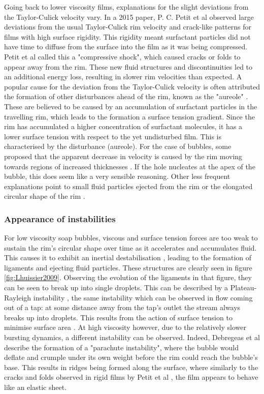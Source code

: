 \documentclass[a4paper,12pt]{article}
\numberwithin{equation}{section}
\numberwithin{figure}{section}
\numberwithin{table}{section}
\begin{document}
Going back to lower viscosity films, explanations for the slight deviations from the Taylor-Culick velocity vary. In a 2015 paper, P. C. Petit et al \cite{Petit2015} observed large deviations from the usual Taylor-Culick rim velocity and crack-like patterns for films with high surface rigidity. This rigidity meant surfactant particles did not have time to diffuse from the surface into the film as it was being compressed. Petit et al called this a "compressive shock", which caused cracks or folds to appear away from the rim. These new fluid structures and discontinuities led to an additional energy loss, resulting in slower rim velocities than expected. A popular cause for the deviation from the Taylor-Culick velocity is often attributed the formation of other disturbances ahead of the rim, known as the "aureole" \cite{McEntee1969, Bico2015, Muller2009}. These are believed to be caused by an accumulation of surfactant particles in the travelling rim, which leads to the formation a surface tension gradient. Since the rim has accumulated a higher concentration of surfactant molecules, it has a lower surface tension with respect to the yet undisturbed film. This is characterised by the disturbance (aureole). For the case of bubbles, some proposed that the apparent decrease in velocity is caused by the rim moving towards regions of increased thicknesses \cite{Mukerjee1971, Debregeas1998}. If the hole nucleates at the apex of the bubble, this does seem like a very sensible reasoning. Other less frequent explanations point to small fluid particles ejected from the rim \cite{Muller2009} or the elongated circular shape of the rim \cite{Bico2015}.

\subsubsection{Appearance of instabilities}
For low viscosity soap bubbles, viscous and surface tension forces are too weak to sustain the rim's circular shape over time as it accelerates and accumulates fluid. This causes it to exhibit an inertial destabilisation \cite{Lhuissier2011}, leading to the formation of ligaments and ejecting fluid particles. These structures are clearly seen in figure \ref{fig:Lhuissier2009}. Observing the evolution of the ligaments in that figure, they can be seen to break up into single droplets. This can be described by a Plateau-Rayleigh instability \cite{Lhuissier2011}, the same instability which can be observed in flow coming out of a tap: at some distance away from the tap's outlet the stream always breaks up into droplets. This results from the action of surface tension to minimise surface area \cite{Rayleigh1878}. At high viscosity however, due to the relatively slower bursting dynamics, a different instability can be observed. Indeed, Debregeas et al \cite{Debregeas1998} describe the formation of a "parachute instability", where the bubble would deflate and crumple under its own weight before the rim could reach the bubble's base. This results in ridges being formed along the surface, where similarly to the cracks and folds observed in rigid films by Petit et al \cite{Petit2015}, the film appears to behave like an elastic sheet.
\end{document}
